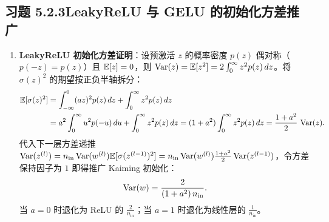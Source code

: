 \subsection*{习题 5.2.3\quad LeakyReLU 与 GELU 的初始化方差推广}
\begin{enumerate}[label=(\alph*), leftmargin=1.8em]
  \item \textbf{LeakyReLU 初始化方差证明}：设预激活 $z$ 的概率密度 $p(z)$ 偶对称（$p(-z) = p(z)$）且 $\mathbb{E}[z] = 0$，则 $\operatorname{Var}(z) = \mathbb{E}[z^2] = 2\int_0^\infty z^2 p(z)\,dz$。将 $\sigma(z)^2$ 的期望按正负半轴拆分：
  \begin{align*}
    \mathbb{E}[\sigma(z)^2]
    &= \int_{-\infty}^0 (a z)^2 p(z)\,dz + \int_0^\infty z^2 p(z)\,dz \\
    &= a^2 \int_0^\infty u^2 p(-u)\,du + \int_0^\infty z^2 p(z)\,dz
     = (1 + a^2) \int_0^\infty z^2 p(z)\,dz
     = \frac{1 + a^2}{2}\,\operatorname{Var}(z).
  \end{align*}
  代入下一层方差递推 $\operatorname{Var}(z^{(l)}) = n_{\text{in}} \operatorname{Var}(w^{(l)}) \mathbb{E}[\sigma(z^{(l-1)})^2] = n_{\text{in}} \operatorname{Var}(w^{(l)}) \frac{1+a^2}{2}\operatorname{Var}(z^{(l-1)})$，令方差保持因子为 $1$ 即得推广 Kaiming 初始化：
  \[
    \operatorname{Var}(w) = \frac{2}{(1 + a^2)\, n_{\text{in}}}.
  \]
  当 $a = 0$ 时退化为 ReLU 的 $\frac{2}{n_{\text{in}}}$；当 $a = 1$ 时退化为线性层的 $\frac{1}{n_{\text{in}}}$。


\end{enumerate}
